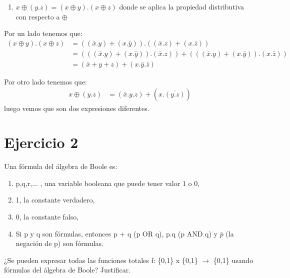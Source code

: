 \documentclass[12pt]{article}
\begin{document}
\begin{enumerate}[left=0pt, label=\alph*), leftmargin=*]
	\item $x \oplus (y.z) = (x \oplus y).(x \oplus z)$ donde se aplica la propiedad distributiva con respecto a $\oplus$
\end{enumerate}

Por un lado tenemos que:
\begin{align*}
	(x \oplus y).(x \oplus z) &= ((\bar x.y) + (x. \bar y)) . ((\bar x .z) + (x. \bar z)) \\
	&= (((\bar x . y) + (x . \bar y)). (\bar x . z)) + (((\bar x .y) + (x . \bar y)).(x. \bar z)) \\
	&= (\bar x + y + z) + (x . \bar y. \bar z)
\end{align*}

Por otro lado tenemos que:
\begin{align*}
	x \oplus (y.z) &= (\bar x . y . z) + (x . \overline{(y.z)})
\end{align*}
luego vemos que son dos expresiones diferentes.

\newpage

\section*{Ejercicio 2}

Una fórmula del álgebra de Boole es:

\begin{enumerate}[left=0pt, label=\alph*), leftmargin=*]
	\item p,q,r,... , una variable booleana que puede tener valor 1 o 0,
	\item 1, la constante verdadero,
	\item 0, la constante falso,
	\item Si p y q son fórmulas, entonces p + q (p OR q), p.q  (p AND q) y $\bar p$ (la negación de p) son fórmulas.
\end{enumerate}

¿Se pueden expresar todas las funciones totales f: \{0,1\} x \{0,1\} $\rightarrow$ \{0,1\} usando fórmulas del álgebra de Boole? Justificar.
\end{document}
